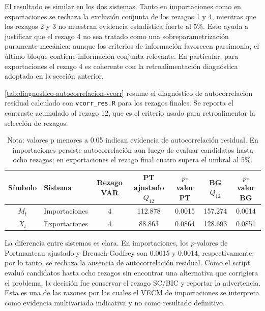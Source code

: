 \documentclass[11pt,a4paper]{article}
\begin{document}
	El resultado es similar en los dos sistemas. Tanto en importaciones como en
	exportaciones se rechaza la exclusión conjunta de los rezagos 1 y 4, mientras
	que los rezagos 2 y 3 no muestran evidencia estadística fuerte al 5\%. Esto
	ayuda a justificar que el rezago 4 no sea tratado como una sobreparametrización
	puramente mecánica: aunque los criterios de información favorecen parsimonia,
	el último bloque contiene información conjunta relevante. En particular, para
	exportaciones el rezago 4 es coherente con la retroalimentación diagnóstica
	adoptada en la sección anterior.
	
	\autoref{tab:diagnostico-autocorrelacion-vcorr} resume el diagnóstico de
	autocorrelación residual calculado con \texttt{vcorr\_res.R} para los rezagos
	finales. Se reporta el contraste acumulado al rezago 12, que es el criterio
	usado para retroalimentar la selección de rezagos.
	
	\begin{table}[H]
		\centering
		\caption{Diagnóstico de autocorrelación residual con \texttt{vcorr\_res.R}.}
		\label{tab:diagnostico-autocorrelacion-vcorr}
		\small
		\begin{tabular}{clccccc}
			\toprule
			Símbolo & Sistema & Rezago VAR & PT ajustado \(Q_{12}\) & \(p\)-valor PT & BG \(Q_{12}\) & \(p\)-valor BG \\
			\midrule
			\(M_t\) & Importaciones & 4 & 112.878 & 0.0015 & 157.274 & 0.0014 \\
			\(X_t\) & Exportaciones & 4 & 88.863 & 0.0864 & 128.693 & 0.0851 \\
			\bottomrule
		\end{tabular}
		\caption*{\footnotesize Nota: valores p menores a 0.05 indican evidencia de
			autocorrelación residual. En importaciones persiste autocorrelación aun luego
			de evaluar candidatos hasta ocho rezagos; en exportaciones el rezago final
			cuatro supera el umbral al 5\%.}
	\end{table}
	
	La diferencia entre sistemas es clara. En importaciones, los \(p\)-valores de
	Portmanteau ajustado y Breusch-Godfrey son 0.0015 y 0.0014, respectivamente;
	por lo tanto, se rechaza la ausencia de autocorrelación residual. Como el
	script evaluó candidatos hasta ocho rezagos sin encontrar una alternativa que
	corrigiera el problema, la decisión fue conservar el rezago SC/BIC y reportar
	la advertencia. Esta es una de las razones por las cuales el VECM de
	importaciones se interpreta como evidencia multivariada indicativa y no como
	resultado definitivo.
	
\end{document}
